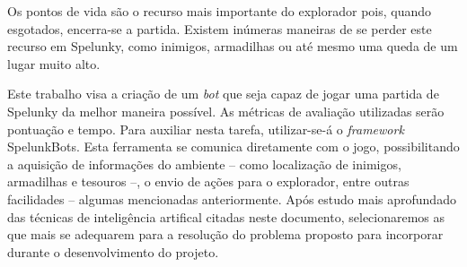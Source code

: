 Os pontos de vida são o recurso mais importante do explorador pois, quando
esgotados, encerra-se a partida. Existem inúmeras maneiras de se perder este
recurso em Spelunky, como inimigos, armadilhas ou até mesmo uma queda de um
lugar muito alto.

Este trabalho visa a criação de um \textit{bot} que seja capaz de jogar uma
partida de Spelunky da melhor maneira possível. As métricas de avaliação
utilizadas serão pontuação e tempo. Para auxiliar nesta tarefa, utilizar-se-á o
\textit{framework} SpelunkBots. Esta ferramenta se comunica diretamente com o
jogo, possibilitando a aquisição de informações do ambiente -- como localização
de inimigos, armadilhas e tesouros --, o envio de ações para o explorador, entre
outras facilidades -- algumas mencionadas anteriormente. Após estudo mais
aprofundado das técnicas de inteligência artifical citadas neste documento,
selecionaremos as que mais se adequarem para a resolução do problema proposto
para incorporar durante o desenvolvimento do projeto.
